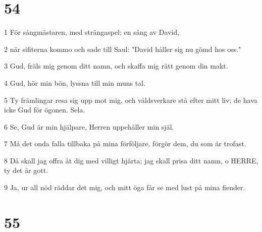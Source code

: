 \chapter{54}

\par 1 För sångmästaren, med strängaspel; en sång av David,
\par 2 när sifiterna kommo och sade till Saul: "David håller sig nu gömd hos oss."
\par 3 Gud, fräls mig genom ditt namn, och skaffa mig rätt genom din makt.
\par 4 Gud, hör min bön, lyssna till min muns tal.
\par 5 Ty främlingar resa sig upp mot mig, och våldsverkare stå efter mitt liv; de hava icke Gud för ögonen. Sela.
\par 6 Se, Gud är min hjälpare, Herren uppehåller min själ.
\par 7 Må det onda falla tillbaka på mina förföljare, förgör dem, du som är trofast.
\par 8 Då skall jag offra åt dig med villigt hjärta; jag skall prisa ditt namn, o HERRE, ty det är gott.
\par 9 Ja, ur all nöd räddar det mig, och mitt öga får se med lust på mina fiender.

\chapter{55}

